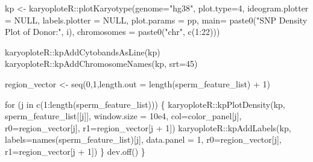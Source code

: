 \documentclass[
  letterpaper,
  DIV=11,
  numbers=noendperiod]{scrreprt}
\newenvironment{Shaded}{\begin{snugshade}}{\end{snugshade}}
\newcommand{\AttributeTok}[1]{\textcolor[rgb]{0.40,0.45,0.13}{#1}}
\newcommand{\ConstantTok}[1]{\textcolor[rgb]{0.56,0.35,0.01}{#1}}
\newcommand{\ControlFlowTok}[1]{\textcolor[rgb]{0.00,0.23,0.31}{#1}}
\newcommand{\DecValTok}[1]{\textcolor[rgb]{0.68,0.00,0.00}{#1}}
\newcommand{\FloatTok}[1]{\textcolor[rgb]{0.68,0.00,0.00}{#1}}
\newcommand{\FunctionTok}[1]{\textcolor[rgb]{0.28,0.35,0.67}{#1}}
\newcommand{\NormalTok}[1]{\textcolor[rgb]{0.00,0.23,0.31}{#1}}
\newcommand{\OtherTok}[1]{\textcolor[rgb]{0.00,0.23,0.31}{#1}}
\newcommand{\SpecialCharTok}[1]{\textcolor[rgb]{0.37,0.37,0.37}{#1}}
\newcommand{\StringTok}[1]{\textcolor[rgb]{0.13,0.47,0.30}{#1}}
\begin{document}
\begin{codelisting}
\begin{Shaded}
\begin{Highlighting}[]
\NormalTok{    kp }\OtherTok{\textless{}{-}}\NormalTok{ karyoploteR}\SpecialCharTok{::}\FunctionTok{plotKaryotype}\NormalTok{(}\AttributeTok{genome=}\StringTok{"hg38"}\NormalTok{, }\AttributeTok{plot.type=}\DecValTok{4}\NormalTok{, }\AttributeTok{ideogram.plotter =} \ConstantTok{NULL}\NormalTok{,}
                    \AttributeTok{labels.plotter =} \ConstantTok{NULL}\NormalTok{, }\AttributeTok{plot.params =}\NormalTok{ pp,}
                    \AttributeTok{main=} \FunctionTok{paste0}\NormalTok{(}\StringTok{"SNP Density Plot of Donor:"}\NormalTok{, i), }
                    \AttributeTok{chromosomes =} \FunctionTok{paste0}\NormalTok{(}\StringTok{"chr"}\NormalTok{, }\FunctionTok{c}\NormalTok{(}\DecValTok{1}\SpecialCharTok{:}\DecValTok{22}\NormalTok{)))}
    
\NormalTok{    karyoploteR}\SpecialCharTok{::}\FunctionTok{kpAddCytobandsAsLine}\NormalTok{(kp)}
\NormalTok{    karyoploteR}\SpecialCharTok{::}\FunctionTok{kpAddChromosomeNames}\NormalTok{(kp, }\AttributeTok{srt=}\DecValTok{45}\NormalTok{)}
    
\NormalTok{    region\_vector }\OtherTok{\textless{}{-}} \FunctionTok{seq}\NormalTok{(}\DecValTok{0}\NormalTok{,}\DecValTok{1}\NormalTok{,}\AttributeTok{length.out =} \FunctionTok{length}\NormalTok{(sperm\_feature\_list) }\SpecialCharTok{+} \DecValTok{1}\NormalTok{)}
      
    \ControlFlowTok{for}\NormalTok{ (j }\ControlFlowTok{in} \FunctionTok{c}\NormalTok{(}\DecValTok{1}\SpecialCharTok{:}\FunctionTok{length}\NormalTok{(sperm\_feature\_list))) \{}
\NormalTok{      karyoploteR}\SpecialCharTok{::}\FunctionTok{kpPlotDensity}\NormalTok{(kp, sperm\_feature\_list[[j]], }\AttributeTok{window.size =} \FloatTok{10e4}\NormalTok{, }\AttributeTok{col=}\NormalTok{color\_panel[j], }\AttributeTok{r0=}\NormalTok{region\_vector[j],}
                    \AttributeTok{r1=}\NormalTok{region\_vector[j }\SpecialCharTok{+} \DecValTok{1}\NormalTok{])}
\NormalTok{      karyoploteR}\SpecialCharTok{::}\FunctionTok{kpAddLabels}\NormalTok{(kp, }\AttributeTok{labels=}\FunctionTok{names}\NormalTok{(sperm\_feature\_list)[j], }\AttributeTok{data.panel =} \DecValTok{1}\NormalTok{, }\AttributeTok{r0=}\NormalTok{region\_vector[j],}
                  \AttributeTok{r1=}\NormalTok{region\_vector[j }\SpecialCharTok{+} \DecValTok{1}\NormalTok{])}
\NormalTok{    \}}
    \FunctionTok{dev.off}\NormalTok{()}
\NormalTok{  \}}
\end{Highlighting}
\end{Shaded}

\end{codelisting}
\end{document}
